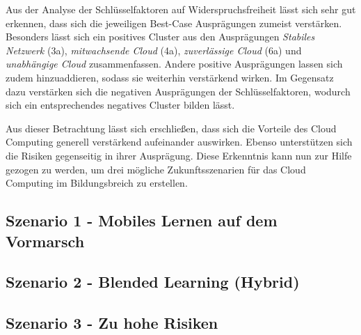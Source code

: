 Aus der Analyse der Schlüsselfaktoren auf Widerspruchsfreiheit lässt sich sehr gut erkennen, dass sich die jeweiligen Best-Case Ausprägungen zumeist verstärken. Besonders lässt sich ein positives Cluster aus den Ausprägungen \textit{Stabiles Netzwerk} (3a), \textit{mitwachsende Cloud} (4a), \textit{zuverlässige Cloud} (6a) und \textit{unabhängige Cloud} zusammenfassen. Andere positive Ausprägungen lassen sich zudem hinzuaddieren, sodass sie weiterhin verstärkend wirken. Im Gegensatz dazu verstärken sich die negativen Ausprägungen der Schlüsselfaktoren, wodurch sich ein entsprechendes negatives Cluster bilden lässt.

Aus dieser Betrachtung lässt sich erschließen, dass sich die Vorteile des Cloud Computing generell verstärkend aufeinander auswirken. Ebenso unterstützen sich die Risiken gegenseitig in ihrer Ausprägung. Diese Erkenntnis kann nun zur Hilfe gezogen zu werden, um drei mögliche Zukunftsszenarien für das Cloud Computing im Bildungsbreich zu erstellen.

\subsection{Szenario 1 - Mobiles Lernen auf dem Vormarsch}
\subsection{Szenario 2 - Blended Learning (Hybrid)}

\subsection{Szenario 3 - Zu hohe Risiken}

